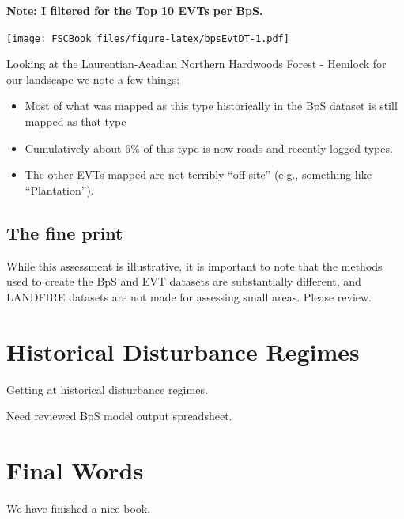 \documentclass[
]{book}
\providecommand{\tightlist}{%
  \setlength{\itemsep}{0pt}\setlength{\parskip}{0pt}}
\begin{document}
\textbf{Note: I filtered for the Top 10 EVTs per BpS.}

\texttt{[image: FSCBook\_files/figure-latex/bpsEvtDT-1.pdf]}

Looking at the Laurentian-Acadian Northern Hardwoods Forest - Hemlock for our landscape we note a few things:

\begin{itemize}
\tightlist
\item
  Most of what was mapped as this type historically in the BpS dataset is still mapped as that type
\item
  Cumulatively about 6\% of this type is now roads and recently logged types.
\item
  The other EVTs mapped are not terribly ``off-site'' (e.g., something like ``Plantation'').
\end{itemize}

\hypertarget{the-fine-print}{%
\section{The fine print}\label{the-fine-print}}

While this assessment is illustrative, it is important to note that the methods used to create the BpS and EVT datasets are substantially different, and LANDFIRE datasets are not made for assessing small areas. Please review.

\hypertarget{histDist}{%
\chapter{Historical Disturbance Regimes}\label{histDist}}

Getting at historical disturbance regimes.

Need reviewed BpS model output spreadsheet.

\hypertarget{final-words}{%
\chapter{Final Words}\label{final-words}}

We have finished a nice book.
\end{document}
